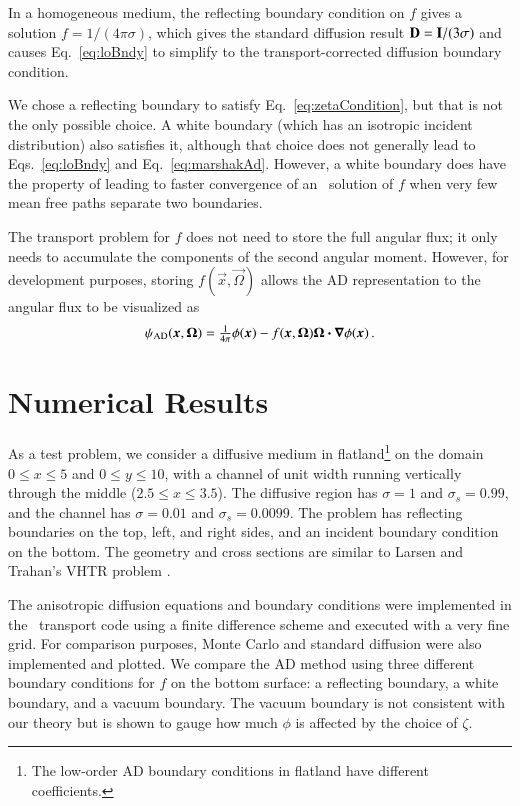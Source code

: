 \documentclass{anstrans}
\begin{document}
In a homogeneous medium, the reflecting boundary condition on $f$ gives a
solution
$f=1/(4\pi\sigma)$, which gives the standard diffusion result $\mathbf{D}=
\mathbf{I}/(3\sigma)$ and causes Eq.~\eqref{eq:loBndy} to simplify to
the transport-corrected diffusion boundary condition.

We chose a reflecting boundary to satisfy Eq.~\eqref{eq:zetaCondition}, but that
is not the only possible choice. A white boundary (which has an isotropic
incident
distribution) also satisfies it,
although that choice does not generally lead to Eqs.~\eqref{eq:loBndy} and
Eq.~\eqref{eq:marshakAd}. However, a white boundary does have the property of
leading to faster convergence of an \SN\ solution of $f$ when very few mean free
paths separate two boundaries.

The transport problem for $f$ does not need to store the full angular flux; it
only needs to accumulate the components of the second angular moment. However,
for development purposes, storing $f(\vec{x},\vec{\Omega})$ allows the AD
representation to the angular flux to be visualized as
\begin{equation*}
  \psi_\text{AD}(\bm{x},\bm{\Omega}) = \tfrac{1}{4\pi} \phi(\bm{x})
  - f(\bm{x},\bm{\Omega}) \bm{\Omega} \bm{\cdot} \bm{\nabla} \phi(\bm{x})\,.
\end{equation*}

\section{Numerical Results}
As a test problem, we consider a diffusive medium in flatland\footnote{The
low-order AD boundary conditions in flatland have different coefficients.} on
the domain $0
\le x \le 5$ and $0 \le y \le 10$, with a channel of unit width running
vertically through the middle ($2.5 \le x \le 3.5$). The diffusive region has
$\sigma=1$ and
$\sigma_s=0.99$, and the channel has $\sigma=0.01$ and $\sigma_s=0.0099$. The
problem has
reflecting boundaries on the top, left, and right sides, and an incident
boundary condition on the bottom. The geometry and cross sections are similar
to Larsen
and Trahan's VHTR problem \cite{Lar2009c}.

The anisotropic diffusion equations and boundary conditions were implemented
in the \pytrt\ transport code \cite{Pytrt} using a finite difference scheme
and executed with a very fine grid. For comparison
purposes, Monte Carlo and standard diffusion were also implemented and plotted.
We compare the AD method using three different boundary conditions for $f$ on
the bottom surface: a reflecting boundary, a white boundary, and a vacuum
boundary. The vacuum boundary is not consistent with our theory but
is shown to gauge how much $\phi$ is affected by the choice of $\zeta$.
\end{document}
